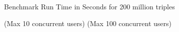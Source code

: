 Benchmark Run Time in Seconds for 200 million triples

(Max 10 concurrent users) (Max 100 concurrent users)